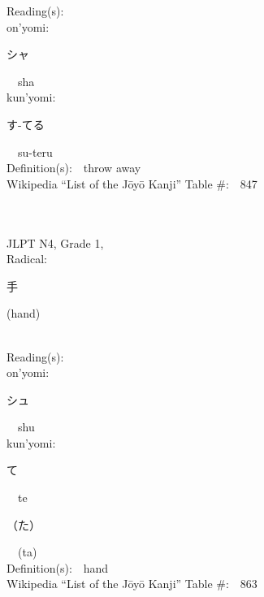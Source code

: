 \begin{multicols}{2}
Reading(s):\ \ \\
{\hspace*{1em}}on'yomi:\ \ \\
{\hspace*{2em}}{\begin{CJK}{UTF8}{min} シャ \end{CJK}}\ \ sha\ \ \\
{\hspace*{1em}}kun'yomi:\ \ \\
{\hspace*{2em}}{\begin{CJK}{UTF8}{min} す-てる \end{CJK}}\ \ su-teru\ \ \\
Definition(s):\ \ throw away \\
Wikipedia ``List of the J\=oy\=o Kanji'' Table \#:\ \ 847 \\
\ \ \\
{\fontsize{34pt}{40pt}  }\ \ \\  %
{JLPT N4, Grade 1, \\Radical:\ \ {\begin{CJK}{UTF8}{min} 手 \end{CJK}} (hand) } \\
Reading(s):\ \ \\
{\hspace*{1em}}on'yomi:\ \ \\
{\hspace*{2em}}{\begin{CJK}{UTF8}{min} シュ \end{CJK}}\ \ shu\ \ \\
{\hspace*{1em}}kun'yomi:\ \ \\
{\hspace*{2em}}{\begin{CJK}{UTF8}{min} て \end{CJK}}\ \ te\ \ \\
{\hspace*{2em}}{\begin{CJK}{UTF8}{min} （た） \end{CJK}}\ \ (ta)\ \ \\
Definition(s):\ \ hand \\
Wikipedia ``List of the J\=oy\=o Kanji'' Table \#:\ \ 863 \\

\end{multicols}
